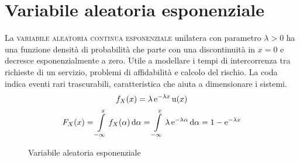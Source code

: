 \section{Variabile aleatoria esponenziale}
La \textsc{variabile aleatoria continua esponenziale} unilatera con parametro $\lambda>0$ ha una funzione densità di probabilità che parte con una discontinuità in $x=0$ e decresce esponenzialmente a zero. Utile a modellare i tempi di intercorrenza tra richieste di un servizio, problemi di affidabilità e calcolo del rischio. La coda indica eventi rari trascurabili, caratteristica che aiuta a dimensionare i sistemi.
\begin{equation}
f_X(x)=\lambda\operatorname{e}^{-\lambda x}\operatorname{u}(x)
\end{equation}
\begin{equation}
F_X(x)=\int\limits_{-\infty}^{x}{f_X(\alpha)}{\,\mathop{}\!\mathrm{d}{\alpha}}=\int\limits_{-\infty}^{x}{\lambda\operatorname{e}^{-\lambda \alpha}}{\,\mathop{}\!\mathrm{d}{\alpha}}=1-\operatorname{e}^{-\lambda x}
\end{equation}
\begin{figure}[h!]
	\centering
	 \qquad
	\caption{Variabile aleatoria esponenziale}
\end{figure}

